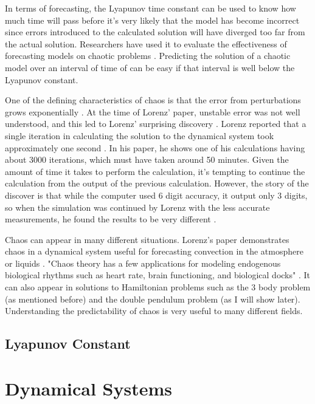 \documentclass{article}
\begin{document}
In terms of forecasting, the Lyapunov time constant can be
used to know how much time
will pass before it's very likely that the model has become incorrect since
errors introduced to the calculated solution will have diverged too far from
the actual solution. 
Researchers have used it to evaluate the effectiveness of forecasting models on
chaotic problems \cite{pathak2018model}. Predicting the solution of
a chaotic model over an interval of time of can be easy if that interval is well
below the Lyapunov constant.

One of the defining characteristics of chaos is that the error from 
perturbations grows exponentially \cite{oestreicher2007history}. At the time of 
Lorenz' paper, unstable 
error was not well understood, and this led to Lorenz' surprising discovery 
\cite{oestreicher2007history}. Lorenz reported that a single iteration in 
calculating the solution to the dynamical system took 
approximately one second \cite{lorenz1963deterministic}. In his paper, he shows 
one of his calculations having about 3000 iterations, which must have taken 
around 50 minutes. Given the amount of time it takes to perform the calculation,
it's tempting to continue the calculation from the output of the previous 
calculation. However, the story of the discover is that while the computer used 
6 digit accuracy, it output only 3 digits, so when the simulation was continued 
by Lorenz with the less accurate measurements, he found the results to be very 
different \cite{oestreicher2007history}. 

Chaos can appear in many different situations. Lorenz's paper demonstrates chaos
in a dynamical system useful for forecasting convection in the atmosphere or 
liquids \cite{lorenz1963deterministic}. "Chaos theory has a few applications for
modeling endogenous biological rhythms such as heart rate, brain functioning, 
and biological docks" \cite{oestreicher2007history}. It can also appear in 
solutions to Hamiltonian problems such as the 3 body problem (as mentioned 
before) and the double pendulum problem (as I will show later). Understanding
the predictability of chaos is very useful to many different fields.

\subsection{Lyapunov Constant}

\section{Dynamical Systems}
\end{document}
